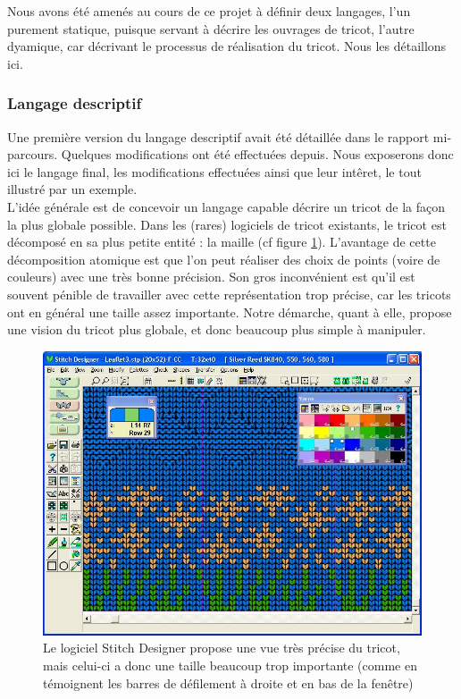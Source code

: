\documentclass{article}
\begin{document}
Nous avons été amenés au cours de ce projet à définir deux langages,
l'un purement statique, puisque servant à décrire les ouvrages de
tricot, l'autre dyamique, car décrivant le processus de réalisation du
tricot. Nous les détaillons ici.

\subsubsection{Langage descriptif}

Une première version du langage descriptif avait été détaillée dans le
rapport mi-parcours. Quelques modifications ont été effectuées
depuis. Nous exposerons donc ici le langage final, les modifications
effectuées ainsi que leur intêret, le tout illustré par un exemple. \\


L'idée générale est de concevoir un langage capable décrire un tricot
de la façon la plus globale possible. Dans les (rares) logiciels de
tricot existants, le tricot est décomposé en sa plus petite entité
: la maille (cf figure \ref{logiciel}). L'avantage de cette
décomposition atomique est que l'on peut réaliser des choix de points
(voire de couleurs) avec une très bonne précision. 
Son gros inconvénient est qu'il est souvent
pénible de travailler avec cette représentation trop précise, car les tricots 
ont en général une taille assez importante. %
Notre démarche, quant à elle, propose une vision du tricot plus globale, 
et donc beaucoup plus simple à manipuler.

\begin{figure}[!ht]
  \centering \includegraphics[scale=0.3]{../img/grid.jpg}
  \caption{Le logiciel Stitch Designer propose une vue très précise du
    tricot, mais celui-ci a donc une taille beaucoup trop importante
    (comme en témoignent les barres de défilement à droite et en bas
    de la fenêtre)}
  \label{logiciel}
\end{figure}
\end{document}
